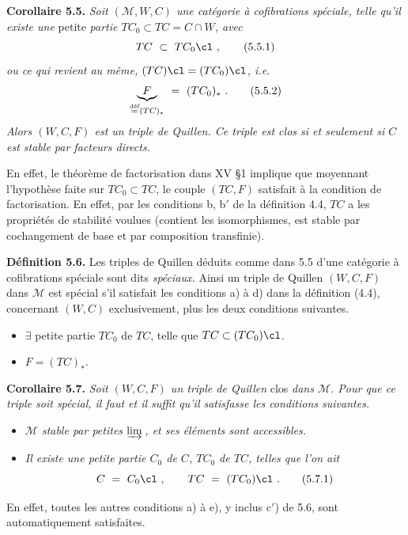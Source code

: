\textbf{Corollaire 5.5.} \textit{Soit $(\mathcal{M}, W, C)$ une catégorie à cofibrations spéciale, telle qu'il existe une} petite \textit{partie $TC_0 \subset TC = C \cap W$, avec}
\[
TC \ \subset \ TC_0\cl\ ,
\tag*{(5.5.1)}
\]
\textit{ou ce qui revient au même, $(TC)\cl = (TC_0)\cl$, i.e.}
\[
\underbrace{F}_{\defeq (TC)_*} \ = \ (TC_0)_*\ .
\tag*{(5.5.2)}
\]
\textit{Alors $(W, C, F)$ est un triple de Quillen. Ce triple est clos si et seulement si $C$ est stable par facteurs directs.}

En effet, le théorème de factorisation dans XV §1 implique que moyennant l'hypothèse faite sur $TC_0 \subset TC$, le couple $(TC, F)$ satisfait à la condition de factorisation. En effet, par les conditions b, b$'$ de la définition 4.4, $TC$ a les propriétés de stabilité voulues (contient les isomorphismes, est stable par cochangement de base et par composition transfinie).

\textbf{Définition 5.6.} Les triples de Quillen déduits comme dans 5.5 d'une catégorie à cofibrations spéciale sont dits \textit{spéciaux.} Ainsi un triple de Quillen $(W, C, F)$ dans $\mathcal{M}$ est spécial s'il satisfait les conditions a) à d) dans la définition (4.4), concernant $(W, C)$ exclusivement, plus les deux conditions suivantes.

\begin{itemize}[leftmargin=3em]
\item[\encircled{c$'$}] $\exists$ petite partie $TC_0$ de $TC$, telle que $TC \subset (TC_0)\cl$.
\item[\encircled{e}] $F = (TC)_*$.
\end{itemize}

\textbf{Corollaire 5.7.} \textit{Soit $(W, C, F)$ un triple de Quillen} clos \textit{dans $\mathcal{M}$. Pour que ce triple soit spécial, il faut et il suffit qu'il satisfasse les conditions suivantes.}
\begin{itemize}[leftmargin=3em]
\item[\encircled{a}] \textit{$\mathcal{M}$ stable par petites $\varinjlim$\,, et ses éléments sont accessibles.}
\item[\encoval{c, c$'$}] \textit{Il existe une petite partie $C_0$ de $C$, $TC_0$ de $TC$, telles que l'on ait}
\[
C \ = \ C_0\cl\ , \qquad TC \ = \ (TC_0)\cl\ .
\tag*{(5.7.1)}
\]
\end{itemize}
En effet, toutes les autres conditions a) à e), y inclus c$'$) de 5.6, sont automatiquement satisfaites.

